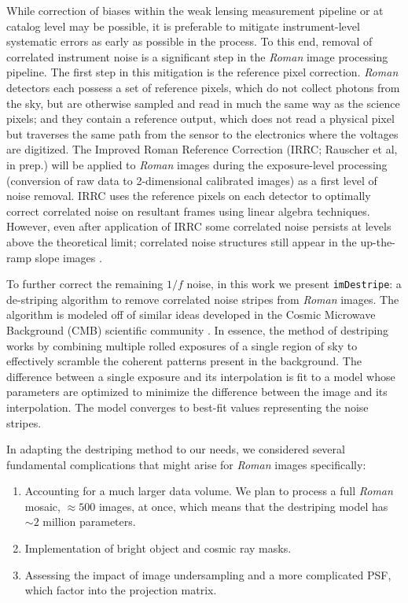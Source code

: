 \documentclass[]{pasj01}
\begin{document}
While correction of biases within the weak lensing measurement pipeline or at catalog level may be possible, it is preferable to mitigate instrument-level systematic errors as early as possible in the process. To this end, removal of correlated instrument noise is a significant step in the \textit{Roman} image processing pipeline. The first step in this mitigation is the reference pixel correction. \textit{Roman} detectors each possess a set of reference pixels, which do not collect photons from the sky, but are otherwise sampled and read in much the same way as the science pixels; and they contain a reference output, which does not read a physical pixel but traverses the same path from the sensor to the electronics where the voltages are digitized. The Improved Roman Reference Correction (IRRC; Rauscher et al, in prep.) will be applied to \textit{Roman} images during the exposure-level processing (conversion of raw data to 2-dimensional calibrated images) as a first level of noise removal. IRRC uses the reference pixels on each detector to optimally correct correlated noise on resultant frames using linear algebra techniques. However, even after application of IRRC some correlated noise persists at levels above the theoretical limit; correlated noise structures still appear in the up-the-ramp slope images \citet{Betti2024}.

To further correct the remaining $1/f$ noise, in this work we present \texttt{imDestripe}: a de-striping algorithm to remove correlated noise stripes from \textit{Roman} images. The algorithm is modeled off of similar ideas developed in the Cosmic Microwave Background (CMB) scientific community \citet{Delabrouille1998, Keihanen2004, Sutton2009}. In essence, the method of destriping works by combining multiple rolled exposures of a single region of sky to effectively scramble the coherent patterns present in the background. The difference between a single exposure and its interpolation is fit to a model whose parameters are optimized to minimize the difference between the image and its interpolation. The model converges to best-fit values representing the noise stripes.

In adapting the destriping method to our needs, we considered several fundamental complications that might arise for \textit{Roman} images specifically:
\begin{enumerate}
    \item Accounting for a much larger data volume. We plan to process a full \textit{Roman} mosaic, $\approx500$ images, at once, which means that the destriping model has $\sim 2$ million parameters.
    \item Implementation of bright object and cosmic ray masks.
    \item Assessing the impact of image undersampling and a more complicated PSF, which factor into the projection matrix. 
\end{enumerate}
\end{document}
